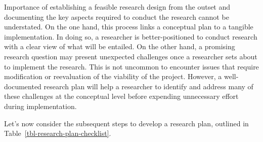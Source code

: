 \documentclass[
  letterpaper,
]{latex/krantz}
\theoremstyle{definition}
\theoremstyle{remark}
\begin{document}
Importance of establishing a feasible research design from the outset
and documenting the key aspects required to conduct the research cannot
be understated. On the one hand, this process links a conceptual plan to
a tangible implementation. In doing so, a researcher is
better-positioned to conduct research with a clear view of what will be
entailed. On the other hand, a promising research question may present
unexpected challenges once a researcher sets about to implement the
research. This is not uncommon to encounter issues that require
modification or reevaluation of the viability of the project. However, a
well-documented research plan will help a researcher to identify and
address many of these challenges at the conceptual level before
expending unnecessary effort during implementation.

Let's now consider the subsequent steps to develop a research plan,
outlined in Table~\ref{tbl-research-plan-checklist}.
\end{document}
